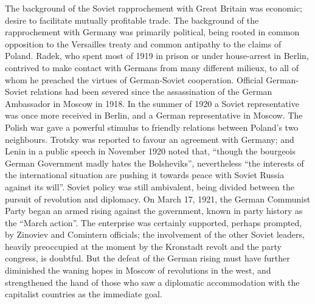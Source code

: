 The background of the Soviet rapprochement with Great Britain was economic; desire to facilitate mutually profitable trade. The background of the rapprochement with Germany was primarily political, being rooted in common opposition to the Versailles treaty and common antipathy to the claims of Poland. Radek, who spent most of 1919 in prison or under house-arrest in Berlin, contrived to make contact with Germans from many different milieux, to all of whom he preached the virtues of German-Soviet cooperation. Official German-Soviet relations had been severed since the assassination of the German Ambassador in Moscow in 1918. In the summer of 1920 a Soviet representative was once more received in Berlin, and a German representative in Moscow. The Polish war gave a powerful stimulus to friendly relations between Poland's two neighbours. Trotsky was reported to favour an agreement with Germany; and Lenin in a public speech in November 1920 noted that, ``though the bourgeois German Government madly hates the Bolsheviks'', nevertheless ``the interests of the international situation are pushing it towards peace with Soviet Russia against its will''. Soviet policy was still ambivalent, being divided between the pursuit of revolution and diplomacy. On March 17, 1921, the German Communist Party began an armed rising against the government, known in party history as the ``March action''. The enterprise was certainly supported, perhaps prompted, by Zinoviev and Comintern officials; the involvement of the other Soviet leaders, heavily preoccupied at the moment by the Kronstadt revolt and the party congress, is doubtful. But the defeat of the German rising must have further diminished the waning hopes in Moscow of revolutions in the west, and strengthened the hand of those who saw a diplomatic accommodation with the capitalist countries as the immediate goal. 

